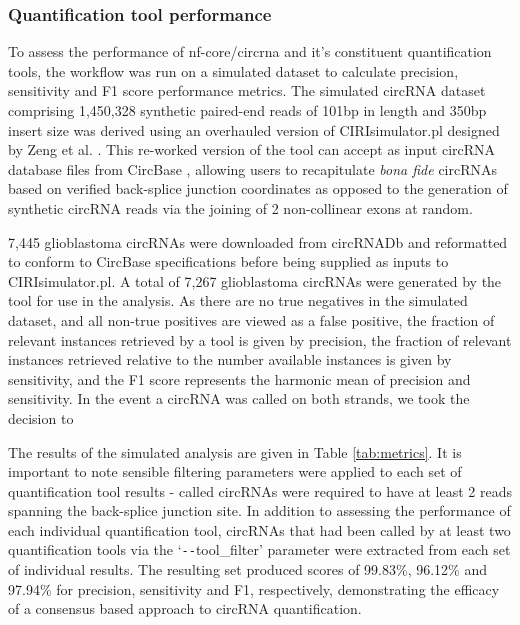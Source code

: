 \documentclass{bmcart}
\begin{document}
\subsubsection*{\textbf{Quantification tool performance}}
To assess the performance of nf-core/circrna and it's constituent quantification tools, the workflow was run on a simulated dataset to calculate precision, sensitivity and F1 score performance metrics. The simulated circRNA dataset comprising 1,450,328 synthetic paired-end reads of 101bp in length and 350bp insert size was derived using an overhauled version of CIRIsimulator.pl \cite{CIRI} designed by Zeng et al. \cite{Zeng2017Jun}. This re-worked version of the tool can accept as input circRNA database files from CircBase \cite{circbase}, allowing users to recapitulate \textit{bona fide} circRNAs based on verified back-splice junction coordinates as opposed to the generation of synthetic circRNA reads via the joining of 2 non-collinear exons at random. \par 
7,445 glioblastoma circRNAs were downloaded from circRNADb \cite{circrna_db} and reformatted to conform to CircBase specifications before being supplied as inputs to CIRIsimulator.pl. A total of 7,267 glioblastoma circRNAs were generated by the tool for use in the analysis. As there are no true negatives in the simulated dataset, and all non-true positives are viewed as a false positive, the fraction of relevant instances retrieved by a tool is given by precision, the fraction of relevant instances retrieved relative to the number available instances is given by sensitivity, and the F1 score represents the harmonic mean of precision and sensitivity. In the event a circRNA was called on both strands, we took the decision to  \par
The results of the simulated analysis are given in Table \ref{tab:metrics}. It is important to note sensible filtering parameters were applied to each set of quantification tool results - called circRNAs were required to have at least 2 reads spanning the back-splice junction site. In addition to assessing the performance of each individual quantification tool, circRNAs that had been called by at least two quantification tools via the `\texttt{-{}-}tool\_filter' parameter were extracted from each set of individual results. The resulting set produced scores of 99.83\%, 96.12\% and 97.94\% for precision, sensitivity and F1, respectively, demonstrating the efficacy of a consensus based approach to circRNA quantification. 
\end{document}

